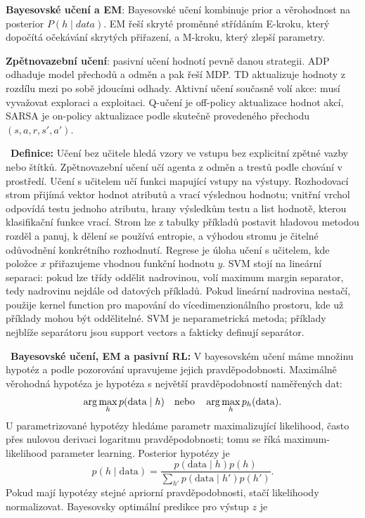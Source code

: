 \textbf{Bayesovské učení a EM}: Bayesovské učení kombinuje prior a věrohodnost na posterior $P(h\mid data)$. EM řeší skryté proměnné střídáním E-kroku, který dopočítá očekávání skrytých přiřazení, a M-kroku, který zlepší parametry.

\textbf{Zpětnovazební učení}: pasivní učení hodnotí pevně danou strategii. ADP odhaduje model přechodů a odměn a pak řeší MDP. TD aktualizuje hodnoty z rozdílu mezi po sobě jdoucími odhady. Aktivní učení současně volí akce: musí vyvažovat exploraci a exploitaci. Q-učení je off-policy aktualizace hodnot akcí, SARSA je on-policy aktualizace podle skutečně provedeného přechodu $(s,a,r,s',a')$.

\begin{odpoved}
\setlength{\parskip}{2pt}
\noindent{}\ \textbf{Definice:} Učení bez učitele hledá vzory ve vstupu bez explicitní zpětné vazby nebo štítků. Zpětnovazební učení učí agenta z odměn a trestů podle chování v prostředí. Učení s učitelem učí funkci mapující vstupy na výstupy. Rozhodovací strom přijímá vektor hodnot atributů a vrací výslednou hodnotu; vnitřní vrchol odpovídá testu jednoho atributu, hrany výsledkům testu a list hodnotě, kterou klasifikační funkce vrací. Strom lze z tabulky příkladů postavit hladovou metodou rozděl a panuj, k dělení se používá entropie, a výhodou stromu je čitelné odůvodnění konkrétního rozhodnutí. Regrese je úloha učení s učitelem, kde položce $x$ přiřazujeme vhodnou funkční hodnotu $y$. SVM stojí na lineární separaci: pokud lze třídy oddělit nadrovinou, volí maximum margin separator, tedy nadrovinu nejdále od datových příkladů. Pokud lineární nadrovina nestačí, použije kernel function pro mapování do vícedimenzionálního prostoru, kde už příklady mohou být oddělitelné. SVM je neparametrická metoda; příklady nejblíže separátoru jsou support vectors a fakticky definují separátor.\par
\noindent{}\ \textbf{Bayesovské učení, EM a pasivní RL:} V bayesovském učení máme množinu hypotéz a podle pozorování upravujeme jejich pravděpodobnosti. Maximálně věrohodná hypotéza je hypotéza s největší pravděpodobností naměřených dat:
\[
\arg\max_h p(\mathrm{data}\mid h)
\quad\hbox{nebo}\quad
\arg\max_h p_h(\mathrm{data}).
\]
U parametrizované hypotézy hledáme parametr maximalizující likelihood, často přes nulovou derivaci logaritmu pravděpodobnosti; tomu se říká maximum-likelihood parameter learning. Posterior hypotézy je
\[
p(h\mid\mathrm{data})=\frac{p(\mathrm{data}\mid h)p(h)}{\sum_{h'}p(\mathrm{data}\mid h')p(h')}.
\]
Pokud mají hypotézy stejné apriorní pravděpodobnosti, stačí likelihoody normalizovat. Bayesovsky optimální predikce pro výstup $z$ je

\end{odpoved}
